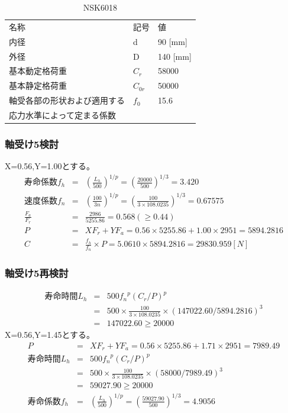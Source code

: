 \documentclass[a4j,twoside,openright,11pt]{jreport}
\begin{document}
\begin{table}[htb]
\begin{center}
  \caption{NSK6018}
  \begin{tabular}{lll} \hline
名称&記号&値\\
内径& d & 90 [mm]\\
外径& D & 140 [mm]\\
基本動定格荷重&$C_{r}$&58000\\
基本静定格荷重&$C_{0r}$&50000\\
軸受各部の形状および適用する&$f_0$&15.6\\
応力水準によって定まる係数&&\\
\hline
  \end{tabular}
\end{center}
\end{table}

\subsubsection{軸受け5検討}
X=0.56,Y=1.00とする。
\begin{eqnarray}
寿命係数f_h &=& \left( \frac{L_h}{500} \right)^{1/p} = \left( \frac{20000}{500} \right)^{1/3} = 3.420\\
速度係数f_n &=& \left( \frac{100}{3n} \right)^{1/p} = \left( \frac{100}{3 \times 108.0235} \right)^{1/3} = 0.67575\\
\frac{F_a}{F_r} &=& \frac{2986}{5255.86} = 0.568(\geq 0.44)\\
P &=& XF_r+YF_a = 0.56 \times 5255.86 + 1.00 \times 2951 = 5894.2816\\
C &=& \frac{f_h}{f_n} \times P = 5.0610 \times 5894.2816 = 29830.959[N]
\end{eqnarray}

\subsubsection{軸受け5再検討}
\begin{eqnarray}
寿命時間L_h &=& 500{f_n}^p(C_r/P)^p\\
           &=& 500 \times \frac{100}{3 \times 108.0235} \times (147022. 60/5894.2816)^3\\
           &=& 147022.60 \geq 20000
\end{eqnarray}
X=0.56,Y=1.45とする。
\begin{eqnarray}
P &=& XF_r+YF_a = 0.56 \times 5255.86 + 1.71 \times 2951 =7989.49\\
寿命時間L_h &=& 500{f_n}^p(C_r/P)^p\\
           &=& 500 \times \frac{100}{3 \times 108.0235} \times (58000/7989.49)^3\\
           &=& 59027.90 \geq 20000\\
寿命係数f_h &=& \left( \frac{L_h}{500} \right)^{1/p} = \left( \frac{59027.90}{500} \right)^{1/3} = 4.9056
\end{eqnarray}
\end{document}
